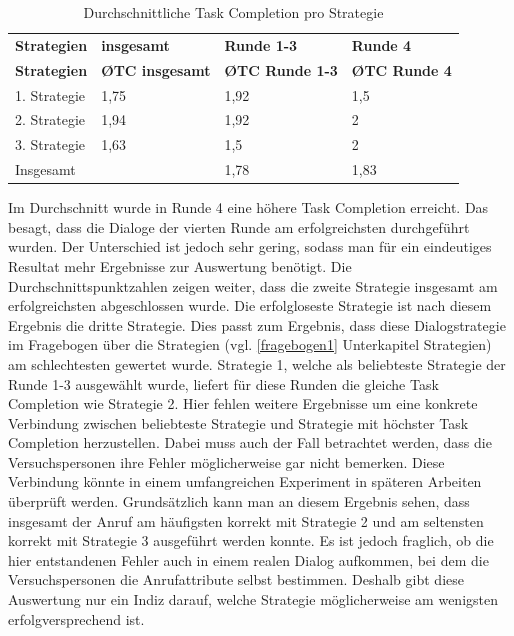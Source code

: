 \documentclass[12pt,a4paper]{scrartcl}
\begin{document}
\begin{longtable}{p{3cm}p{3cm}p{3cm}p{3cm} }
	\label{TCV1}\\
	\caption[Durchschnittliche Task Completion pro Strategie]{Durchschnittliche Task Completion pro Strategie}\\
	\hline
\textbf{Strategien}&\textbf{insgesamt}&\textbf{Runde 1-3} &\textbf{Runde 4}\\
	\hline
	\endfirsthead
	\hline
	\textbf{Strategien}&\textbf{\O TC insgesamt}&\textbf{\O TC Runde 1-3} &\textbf{\O TC Runde 4}\\
	\hline
	\endhead
1. Strategie & 1,75 & 1,92 & 1,5  \\
2. Strategie & 1,94 & 1,92 & 2  \\
3. Strategie & 1,63 & 1,5 & 2  \\
\hline
Insgesamt & & 1,78 & 1,83 \\ 
\hline
\end{longtable}

Im Durchschnitt wurde in Runde 4 eine höhere Task Completion erreicht. Das besagt, dass die Dialoge der vierten Runde am erfolgreichsten durchgeführt wurden. Der Unterschied ist jedoch sehr gering, sodass man für ein eindeutiges Resultat mehr Ergebnisse zur Auswertung benötigt. Die Durchschnittspunktzahlen zeigen weiter, dass die zweite Strategie insgesamt am erfolgreichsten abgeschlossen wurde. Die erfolgloseste Strategie ist nach diesem Ergebnis die dritte Strategie. Dies passt zum Ergebnis, dass diese Dialogstrategie im Fragebogen über die Strategien (vgl. \ref{fragebogen1} Unterkapitel Strategien) am schlechtesten gewertet wurde. Strategie 1, welche als beliebteste Strategie der Runde 1-3 ausgewählt wurde, liefert für diese Runden die gleiche Task Completion wie Strategie 2. Hier fehlen weitere Ergebnisse um eine konkrete Verbindung zwischen beliebteste Strategie und Strategie mit höchster Task Completion herzustellen. Dabei muss auch der Fall betrachtet werden, dass die Versuchspersonen ihre Fehler möglicherweise gar nicht bemerken. Diese Verbindung könnte in einem umfangreichen Experiment in späteren Arbeiten überprüft werden. 
Grundsätzlich kann man an diesem Ergebnis sehen, dass insgesamt der Anruf am häufigsten korrekt mit Strategie 2 und am seltensten korrekt mit Strategie 3 ausgeführt werden konnte. \newline
Es ist jedoch fraglich, ob die hier entstandenen Fehler auch in einem realen Dialog aufkommen, bei dem die Versuchspersonen die Anrufattribute selbst bestimmen. Deshalb gibt diese Auswertung nur ein Indiz darauf, welche Strategie möglicherweise am wenigsten erfolgversprechend  ist. 
\end{document}
